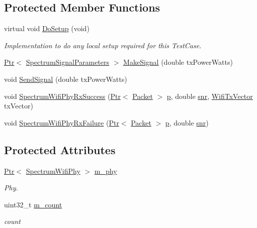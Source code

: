 \subsection*{Protected Member Functions}
\begin{DoxyCompactItemize}
\item 
virtual void \hyperlink{classSpectrumWifiPhyBasicTest_a34f2cbd2cf4e0fb06ef96efe8afc8bdd}{Do\+Setup} (void)
\begin{DoxyCompactList}\small\item\em Implementation to do any local setup required for this Test\+Case. \end{DoxyCompactList}\item 
\hyperlink{classns3_1_1Ptr}{Ptr}$<$ \hyperlink{structns3_1_1SpectrumSignalParameters}{Spectrum\+Signal\+Parameters} $>$ \hyperlink{classSpectrumWifiPhyBasicTest_a131420d781cf323bd84a848053a2fa6e}{Make\+Signal} (double tx\+Power\+Watts)
\item 
void \hyperlink{classSpectrumWifiPhyBasicTest_a99a44e9e6abcf378592b2a2df06ba394}{Send\+Signal} (double tx\+Power\+Watts)
\item 
void \hyperlink{classSpectrumWifiPhyBasicTest_a1aca75f1b9b01f5f3e6843a4f4210854}{Spectrum\+Wifi\+Phy\+Rx\+Success} (\hyperlink{classns3_1_1Ptr}{Ptr}$<$ \hyperlink{classns3_1_1Packet}{Packet} $>$ \hyperlink{lte__link__budget__x2__handover__measures_8m_ac9de518908a968428863f829398a4e62}{p}, double \hyperlink{lte__pathloss_8m_ae6e82a215dff6b79fb6e9952a1b78453}{snr}, \hyperlink{classns3_1_1WifiTxVector}{Wifi\+Tx\+Vector} tx\+Vector)
\item 
void \hyperlink{classSpectrumWifiPhyBasicTest_ab8d57c5b8063fb9ae4d46cb0e09246b6}{Spectrum\+Wifi\+Phy\+Rx\+Failure} (\hyperlink{classns3_1_1Ptr}{Ptr}$<$ \hyperlink{classns3_1_1Packet}{Packet} $>$ \hyperlink{lte__link__budget__x2__handover__measures_8m_ac9de518908a968428863f829398a4e62}{p}, double \hyperlink{lte__pathloss_8m_ae6e82a215dff6b79fb6e9952a1b78453}{snr})
\end{DoxyCompactItemize}
\subsection*{Protected Attributes}
\begin{DoxyCompactItemize}
\item 
\hyperlink{classns3_1_1Ptr}{Ptr}$<$ \hyperlink{classns3_1_1SpectrumWifiPhy}{Spectrum\+Wifi\+Phy} $>$ \hyperlink{classSpectrumWifiPhyBasicTest_aea1ad31a982e7321017675c050488bd6}{m\+\_\+phy}
\begin{DoxyCompactList}\small\item\em Phy. \end{DoxyCompactList}\item 
uint32\+\_\+t \hyperlink{classSpectrumWifiPhyBasicTest_ae83a18f13f3148251bfbb92502798432}{m\+\_\+count}
\begin{DoxyCompactList}\small\item\em count \end{DoxyCompactList}\end{DoxyCompactItemize}
